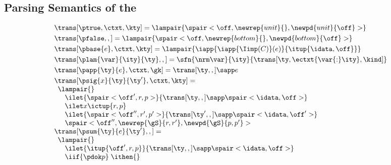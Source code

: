 \subsection{Parsing Semantics of the \ddc{}}
\label{sec:parse-sem}

\begin{figure*}
\small
{} 

\[
\begin{array}{l}
\trans[\ptrue,\ctxt,\kty] =
  \lampair{\spair<\off,\newrep{unit}{},\newpd{unit}{\off}>}
\\[3pt] %
\trans[\pfalse,,] =
  \lampair{\spair<\off,\newrep {bottom}{},\newpd {bottom}{\off}>}
\\[3pt] %
\trans[\pbase{e},\ctxt,\kty] =
  \lampair{\iapp {\iapp {\Iimp(C)} (e)} {\itup {\idata,\off}}}
\\[3pt] %
\trans[\plam{\var}{\ity}{\ty},,] =
   \sfn{\nrm\var}{\ity}{\trans[\ty,\ectxt{\var{:}\ity},\kind]}
\\[3pt] %
\trans[\papp{\ty}{e},\ctxt,\gk] =
  \trans[\ty,,] \sapp e  
\\[3pt]
\trans[\psig{x}{\ty}{\ty'},\ctxt,\kty] = \\
  \begin{array}{l}  
    \lampair{} \\
    \quad  \ilet {\spair<\off',r,p>} 
    {{\trans[\ty,,]} \sapp \spair<\idata,\off>} \\
    \quad  \ilet x {\ictup{r,p}}\\
    \quad  \ilet {\spair<\off'',r',p'>} 
    {{\trans[\ty',,]} \sapp \spair<\idata,\off'>} \\
    \quad \spair<\off'',\newrep {\gS}{r,r'},\newpd {\gS}{p,p'}>
  \end{array}  
\\
  \trans[\psum{\ty}{e}{\ty'},,] = \\
  \begin{array}{l}  
  \lampair{} \\
  \quad \ilet {\itup{\off',r,p}}{\trans[\ty,,] \sapp \spair<\idata,\off>} \\
  \quad \iif {\pdok p} \; \ithen {
    \def \r {\newrep {+left}{r}}
}
\end{array}
\end{array}\]
\end{figure*}
